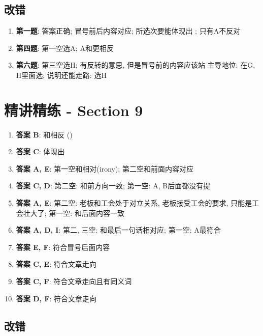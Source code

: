   \subsection{改错}

    \begin{enumerate}
      \item \textbf{第一题}: 答案正确; 冒号前后内容对应; 所选次要能体现出
      ; 只有A不反对
      \item \textbf{第四题}: 第一空选A; A和更相反
      \item \textbf{第六题}: 第三空选H; 有反转的意思, 但是冒号前的内容应该站
      主导地位: 在G, H里面选; 说明还能走路: 选H
    \end{enumerate}

\section{精讲精练 - Section 9}

  \begin{enumerate}
    \item \textbf{答案 B}: 和相反 ()
    \item \textbf{答案 C}: 体现出
    \item \textbf{答案 A, E}: 第一空和相对(irony);
    第二空和前面内容对应
    \item \textbf{答案 C, D}: 第二空: 和前方向一致; 第一空: A, B后面都没有提
    \item \textbf{答案 A, E}: 第二空: 老板和工会处于对立关系, 老板接受工会的要求,
    只能是工会壮大了; 第一空: 和后面内容一致
    \item \textbf{答案 A, D, I}: 第二, 三空: 和最后一句话相对应; 第一空: A最符合
    \item \textbf{答案 E, F}: 符合冒号后面内容
    \item \textbf{答案 C, E}: 符合文章走向
    \item \textbf{答案 C, F}: 符合文章走向且有同义词
    \item \textbf{答案 D, F}: 符合文章走向
  \end{enumerate}

  \subsection{改错}

